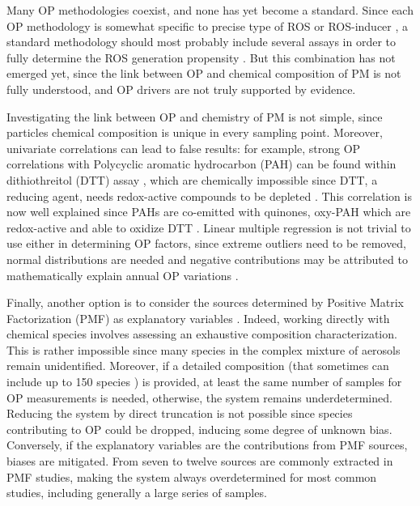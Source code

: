 \documentclass[acp, manuscript]{copernicus}
\begin{document}
Many OP methodologies coexist, and none has yet become a standard. Since each OP
methodology is somewhat specific to precise type of ROS or ROS-inducer
\citep{yang_measurement_2014}, a standard methodology should most probably
include several assays in order to fully determine the ROS generation propensity
\citep{janssen_associations_2015,sauvain_comparison_2013}. But this combination
has not emerged yet, since the link between OP and chemical composition of PM is
not fully understood, and OP drivers are not truly supported by evidence.

Investigating the link between OP and chemistry of PM is not simple, since
particles chemical composition is unique in every sampling point.  Moreover,
univariate correlations can lead to false results: for example, strong OP
correlations with Polycyclic aromatic hydrocarbon (PAH) can be found within
dithiothreitol (DTT) assay \citep{calas_comparison_2018}, which are chemically
impossible since DTT, a reducing agent, needs redox-active compounds to be
depleted \citep{ntziachristos_relationship_2007,shirmohammadi_fine_2016}. This
correlation is now well explained since PAHs are co-emitted with quinones,
oxy-PAH which are redox-active and able to oxidize DTT
\citep{charrier_oxidant_2015,charrier_dithiothreitol_2012}. Linear multiple
regression is not trivial to use either in determining OP factors, since extreme
outliers need to be removed, normal distributions are needed and negative
contributions may be attributed to mathematically explain annual OP variations
\citep{calas_comparison_2018}.

Finally, another option is to consider the sources determined by Positive Matrix
Factorization (PMF) as explanatory variables \citep{bates_reactive_2015}.
Indeed, working directly with chemical species involves assessing an exhaustive
composition characterization. This is rather impossible since many species in
the complex mixture of aerosols remain unidentified.  Moreover, if a detailed
composition (that sometimes can include up to 150 species
\citep{waked_source_2014}) is provided, at least the same number of samples for
OP measurements is needed, otherwise, the system remains underdetermined.
Reducing the system by direct truncation is not possible since species
contributing to OP could be dropped, inducing some degree of unknown bias.
Conversely, if the explanatory variables are the contributions from PMF sources,
biases are mitigated. From seven to twelve sources are commonly extracted in PMF
studies, making the system always overdetermined for most common studies,
including generally a large series of samples.
\end{document}
